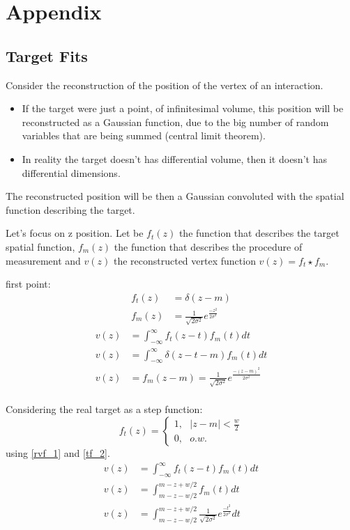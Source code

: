 \chapter{Appendix}
\label{ch:appendix}
\section{Target Fits}
\label{sec:TargetFits}
Consider the reconstruction of the position of the vertex of an interaction.
\begin{itemize}
\item If the target were just a point, of infinitesimal volume, this position will be reconstructed as a Gaussian function, due to the big number of random variables that are being summed (central limit theorem).
\item In reality the target doesn't has differential volume, then it doesn't has differential dimensions.
\end{itemize}
The reconstructed position will be then a Gaussian convoluted with the spatial function describing the target.

Let's focus on z position. Let be $f_t(z)$ the function that describes the target spatial function, $f_m(z)$ the function that describes the procedure of measurement and $v(z)$ the reconstructed vertex function $v(z) = f_t \star f_m$.

first point:
\begin{align}
f_t(z) &= \delta (z-m) \label{tf_1}\\
f_m(z) &= \frac{1}{\sqrt{2\sigma^2}}e^{\frac{-z^2}{2\sigma^2}}\label{mf_1}
\end{align}
\begin{align}
v(z) &= \int_{-\infty}^{\infty} f_t(z-t)f_m(t)dt\label{rvf_1}\\
v(z) &= \int_{-\infty}^{\infty} \delta(z-t-m)f_m(t)dt\\
v(z) &= f_m(z-m) = \frac{1}{\sqrt{2\sigma^2}}e^{\frac{-(z-m)^2}{2\sigma^2}}\\
\end{align}

Considering the real target as a step function:
\begin{equation}
f_t(z) = \left\lbrace\begin{matrix}
1,~~~|z-m|<\frac{w}{2}\\
0,~~~ o.w.
\end{matrix}\right. \label{tf_2}
\end{equation}
using \eqref{rvf_1} and \eqref{tf_2}.
\begin{align}
v(z) &= \int_{-\infty}^{\infty} f_t(z-t)f_m(t)dt\label{rvf_2}\\
v(z) &= \int_{m-z-w/2}^{m-z+w/2} f_m(t)dt\\
v(z) &= \int_{m-z-w/2}^{m-z+w/2} \frac{1}{\sqrt{2\sigma^2}}e^{\frac{-t^2}{2\sigma^2}}dt\label{vz_2b}
\end{align}

